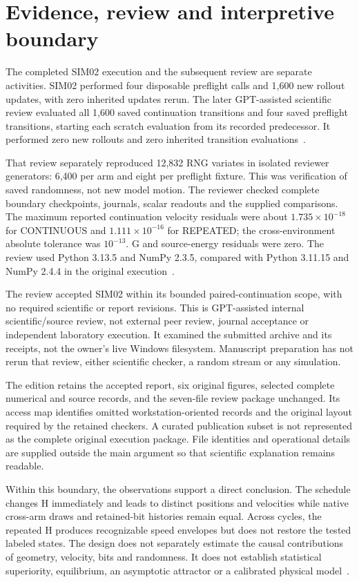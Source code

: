 \documentclass[11pt,a4paper]{article}
\begin{document}
\section{Evidence, review and interpretive boundary}
\label{sec:review}
The completed SIM02 execution and the subsequent review are separate activities. SIM02 performed four disposable preflight calls and 1,600 new rollout updates, with zero inherited updates rerun. The later GPT-assisted scientific review evaluated all 1,600 saved continuation transitions and four saved preflight transitions, starting each scratch evaluation from its recorded predecessor. It performed zero new rollouts and zero inherited transition evaluations~\cite{review,reviewdata}.

That review separately reproduced 12,832 RNG variates in isolated reviewer generators: 6,400 per arm and eight per preflight fixture. This was verification of saved randomness, not new model motion. The reviewer checked complete boundary checkpoints, journals, scalar readouts and the supplied comparisons. The maximum reported continuation velocity residuals were about $1.735\times10^{-18}$ for CONTINUOUS and $1.111\times10^{-16}$ for REPEATED; the cross-environment absolute tolerance was $10^{-13}$. G and source-energy residuals were zero. The review used Python 3.13.5 and NumPy 2.3.5, compared with Python 3.11.15 and NumPy 2.4.4 in the original execution~\cite{review,reviewdata}.

The review accepted SIM02 within its bounded paired-continuation scope, with no required scientific or report revisions. This is GPT-assisted internal scientific/source review, not external peer review, journal acceptance or independent laboratory execution. It examined the submitted archive and its receipts, not the owner's live Windows filesystem. Manuscript preparation has not rerun that review, either scientific checker, a random stream or any simulation.

The edition retains the accepted report, six original figures, selected complete numerical and source records, and the seven-file review package unchanged. Its access map identifies omitted workstation-oriented records and the original layout required by the retained checkers. A curated publication subset is not represented as the complete original execution package. File identities and operational details are supplied outside the main argument so that scientific explanation remains readable.

Within this boundary, the observations support a direct conclusion. The schedule changes H immediately and leads to distinct positions and velocities while native cross-arm draws and retained-bit histories remain equal. Across cycles, the repeated H produces recognizable speed envelopes but does not restore the tested labeled states. The design does not separately estimate the causal contributions of geometry, velocity, bits and randomness. It does not establish statistical superiority, equilibrium, an asymptotic attractor or a calibrated physical model~\cite{sim02,review}.
\end{document}
